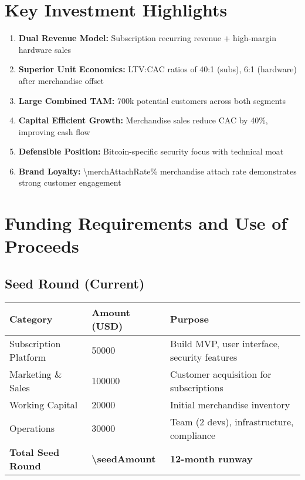 \documentclass[11pt]{article}
\begin{document}
\section{Key Investment Highlights}

\begin{enumerate}
  \item \textbf{Dual Revenue Model:} Subscription recurring revenue + high-margin hardware sales
  \item \textbf{Superior Unit Economics:} LTV:CAC ratios of \num{40}:\num{1} (subs), \num{6}:\num{1} (hardware) after merchandise offset
  \item \textbf{Large Combined TAM:} \num{700}k potential customers across both segments
  \item \textbf{Capital Efficient Growth:} Merchandise sales reduce CAC by \num{40}\%, improving cash flow
  \item \textbf{Defensible Position:} Bitcoin-specific security focus with technical moat
  \item \textbf{Brand Loyalty:} \num{\merchAttachRate}\% merchandise attach rate demonstrates strong customer engagement
\end{enumerate}

\section{Funding Requirements and Use of Proceeds}

\subsection{Seed Round (Current)}
\begin{table}[H]
\centering
\begin{tabularx}{\linewidth}{l Y Y}
\toprule
Category & Amount (USD) & Purpose \\\midrule
Subscription Platform & \num{50000} & Build MVP, user interface, security features \\
Marketing \& Sales & \num{100000} & Customer acquisition for subscriptions \\
Working Capital & \num{20000} & Initial merchandise inventory \\
Operations & \num{30000} & Team (2 devs), infrastructure, compliance \\
\textbf{Total Seed Round} & \textbf{\num{\seedAmount}} & \textbf{12-month runway} \\
\bottomrule
\end{tabularx}
\end{table}
\end{document}
